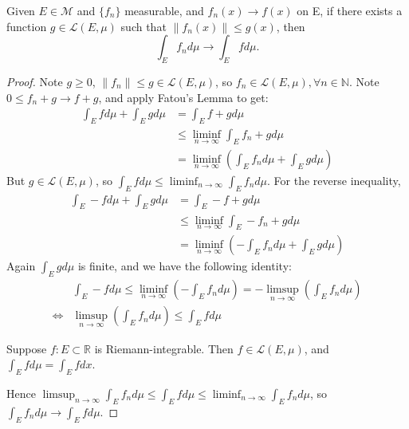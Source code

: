 \documentclass[11pt]{scrartcl}
\begin{document}
\begin{theorem} 
Given $E\in \mathcal{M}$ and $\{f_n\}$ measurable, and $ f_n(x)\rightarrow f(x)$ on E, if there exists a function $g\in \mathscr{L}(E,\mu)$ such that $\|f_n(x)\| \leq g(x)$, then $$ \int_E f_n d\mu \rightarrow \int_E f d\mu.$$
\end{theorem}
\begin{proof}
Note $g\geq 0$, $\|f_n\| \leq g \in \mathscr{L}(E,\mu)$, so $f_n \in \mathscr{L}(E,\mu), \forall n \in \mathbb{N}$. Note $0 \leq f_n + g \rightarrow f + g$, and apply Fatou's Lemma to get:
\begin{align*}
\int_E f d\mu + \int_E g d\mu & = \int_E f+g d\mu \tag{linearity}\\
& \leq \liminf_{n \rightarrow \infty} \int_E f_n + g d\mu \tag{Fatou}\\
& = \liminf_{n \rightarrow \infty}  ( \int_E f_n d\mu + \int_E g d\mu ) \tag{linearity}
\end{align*}
But $g \in \mathscr{L}(E,\mu)$, so $\int_E f d\mu  \leq \liminf_{n \rightarrow \infty} \int_E f_n d\mu$. For the reverse inequality, 
\begin{align*}
\int_E -f d\mu + \int_E g d\mu & = \int_E -f+g d\mu \tag{linearity}\\
& \leq \liminf_{n \rightarrow \infty} \int_E -f_n + g d\mu \tag{Fatou}\\
& = \liminf_{n \rightarrow \infty}  ( - \int_E f_n d\mu + \int_E g d\mu ) \tag{linearity}
\end{align*}
Again $ \int_E g d\mu $ is finite, and we have the following identity:
\begin{align*}
& \int_E -f d\mu \leq \liminf_{n \rightarrow \infty}  ( - \int_E f_n d\mu) = - \limsup_{n \rightarrow \infty}  (\int_E f_n d\mu)\\
\Leftrightarrow & \limsup_{n \rightarrow \infty}  (\int_E f_n d\mu) \leq \int_E f d\mu 
\end{align*}

\begin{theorem}
Suppose $f: E\subset \mathbb{R}$ is Riemann-integrable. Then $f \in \mathscr{L}(E,\mu)$, and $\int_E f d\mu = \int_E f dx$.
\end{theorem}

Hence $ \limsup_{n \rightarrow \infty}  \int_E f_n d\mu \leq \int_E f d\mu \leq \liminf_{n \rightarrow \infty} \int_E f_n d\mu$, so $\int_E f_n d\mu \rightarrow \int_E f d\mu$.
\end{proof}
\end{document}
